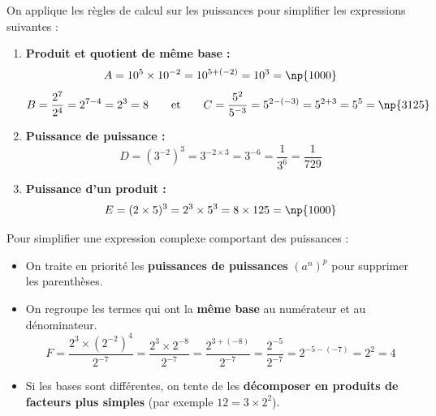 \begin{ex}
	On applique les règles de calcul sur les puissances pour simplifier les expressions suivantes :

	\begin{enumerate}
		\item \textbf{Produit et quotient de même base :}
		      \[
			      A = 10^5 \times 10^{-2} = 10^{5+(-2)} = 10^3 = \np{1000}
		      \]
		      \[
			      B = \frac{2^7}{2^4} = 2^{7-4} = 2^3 = 8 \qquad \text{et} \qquad C = \frac{5^2}{5^{-3}} = 5^{2-(-3)} = 5^{2+3} = 5^5 = \np{3125}
		      \]

		\item \textbf{Puissance de puissance :}
		      \[
			      D = \left( 3^{-2} \right)^3 = 3^{-2 \times 3} = 3^{-6} = \frac{1}{3^6} = \frac{1}{729}
		      \]

		\item \textbf{Puissance d'un produit :}
		      \[
			      E = (2 \times 5)^3 = 2^3 \times 5^3 = 8 \times 125 = \np{1000}
		      \]
	\end{enumerate}
\end{ex}
%
\begin{meth}
	Pour simplifier une expression complexe comportant des puissances :
	\begin{itemize}
		\item On traite en priorité les \textbf{puissances de puissances} $\left( a^n \right)^p$ pour supprimer les parenthèses.
		\item On regroupe les termes qui ont la \textbf{même base} au numérateur et au dénominateur.
		      \[
			      F = \frac{2^3 \times \left( 2^{-2} \right)^4}{2^{-7}} = \frac{2^3 \times 2^{-8}}{2^{-7}} = \frac{2^{3+(-8)}}{2^{-7}} = \frac{2^{-5}}{2^{-7}} = 2^{-5-(-7)} = 2^2 = 4
		      \]
		\item Si les bases sont différentes, on tente de les \textbf{décomposer en produits de facteurs plus simples} (par exemple $12 = 3 \times 2^2$).
	\end{itemize}
\end{meth}


